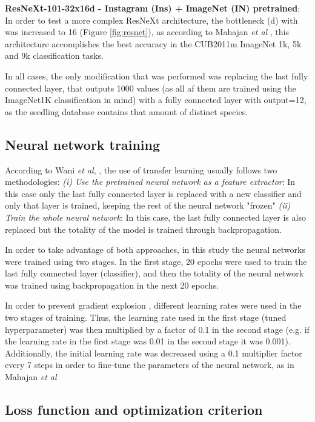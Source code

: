 \documentclass[11pt,onecolumn,titlepage,letterpaper]{article}
\begin{document}
\textbf{ResNeXt-101-32x16d - Instagram (Ins) + ImageNet (IN) pretrained}: In order to test a more complex ResNeXt architecture, the bottleneck (d) with was increased to 16 (Figure \ref{fig:resnet}), as according to Mahajan \textit{et al} \cite{Mahajan2018}, this architecture accomplishes the best accuracy in the CUB2011m ImageNet 1k, 5k and 9k classification tasks.

In all cases, the only modification that was performed was replacing the last fully connected layer, that outputs 1000 values (as all af them are trained using the ImageNet1K classification in mind) with a fully connected layer with output=12, as the seedling database contains that amount of distinct species.

\subsection{Neural network training}

According to Wani \textit{et al}, \cite{Wani2019}, the use of transfer learning usually follows two methodologies:  \textit{(i) Use the pretrained neural network as a feature extractor}: In this case only the last fully connected layer is replaced with a new classifier and only that layer is trained, keeping the rest of the neural network "frozen" \textit{(ii) Train the whole neural network}: In this case, the last fully connected layer is also replaced but the totality of the model is trained through backpropagation.

In order to take advantage of both approaches, in this study the neural networks were trained using two stages. In the first stage, 20 epochs were used to train the last fully connected layer (classifier), and then the totality of the neural network was trained using backpropagation in the next 20 epochs. 

In order to prevent gradient explosion \cite{Aghdam2017}, different learning rates were used in the two stages of training. Thus, the learning rate used in the first stage (tuned hyperparameter) was then multiplied by a factor of 0.1 in the second stage (e.g. if the learning rate in the first stage was 0.01 in the second stage it was 0.001). Additionally, the initial learning rate was decreased using a 0.1 multiplier factor every 7 steps in order to fine-tune the parameters of the neural network, as in Mahajan \textit{et al} \cite{Mahajan2018}


\subsection{Loss function and optimization criterion}
\end{document}
